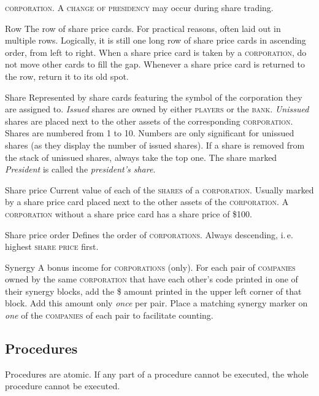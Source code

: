 \documentclass[8pt]{extarticle}
\newenvironment{my_description}
  {\begin{list}{}{\setlength{\labelwidth}{0pt}
   \leftmargin=1.2em
   \setlength{\itemindent}{-\leftmargin}
   \renewcommand{\makelabel}{\descriptionlabel}}
  \setlength{\itemsep}{1pt}
  \setlength{\parskip}{0pt}
  \setlength{\parsep}{0pt}
  }
  {\end{list}}
\begin{document}
\begin{small}
\begin{multicols}{2}
{\begin{my_description}
  \textsc{corporation}. A \textsc{change of presidency} may occur
  during share trading.
\item[Row] The row of share price cards. For practical reasons, often
  laid out in multiple rows. Logically, it is still one long row of
  share price cards in ascending order, from left to right. When a
  share price card is taken by a \textsc{corporation}, do not move
  other cards to fill the gap. Whenever a share price card is
  returned to the row, return it to its old spot.
\item[Share] Represented by share cards featuring the symbol of the
  corporation they are assigned to. \emph{Issued} shares are owned by
  either \textsc{players} or the \textsc{bank}. \emph{Unissued} shares
  are placed next to the other assets of the corresponding
  \textsc{corporation}. Shares are numbered from 1 to 10. Numbers are
  only significant for unissued shares (as they display the number of
  issued shares). If a share is removed from the stack of unissued
  shares, always take the top one. The share marked \emph{President}
  is called the \emph{president's share}.
\item[Share price] Current value of each of the \textsc{shares} of a
  \textsc{corporation}. Usually marked by a share price card placed
  next to the other assets of the \textsc{corporation}. A
  \textsc{corporation} without a share price card has a share price of
  \$100.
\item[Share price order] Defines the order of
  \textsc{corporations}. Always descending, i.\,e. highest
  \textsc{share price} first.
\item[Synergy] A bonus income for \textsc{corporations} (only). For
  each pair of \textsc{companies} owned by the same
  \textsc{corporation} that have each other's code printed in one of
  their synergy blocks, add the \$ amount printed in the upper left
  corner of that block. Add this amount only \emph{once} per
  pair. Place a matching synergy marker on \emph{one} of the
  \textsc{companies} of each pair to facilitate counting.

\end{my_description}

\subsection*{Procedures}

Procedures are atomic. If any part of a procedure cannot be executed,
the whole procedure cannot be executed.

}
\end{multicols}
\end{small}
\end{document}
